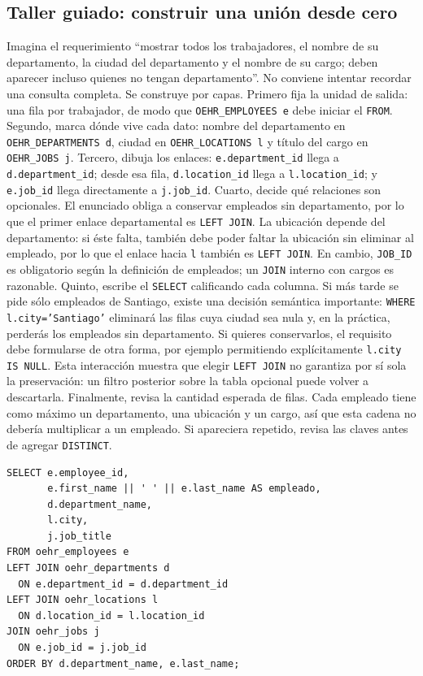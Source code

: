 \documentclass[11pt,a4paper]{article}
\newcommand{\campo}[1]{\texttt{#1}}
\newcommand{\tabla}[1]{\texttt{#1}}
\begin{document}
\subsection{Taller guiado: construir una unión desde cero}

Imagina el requerimiento ``mostrar todos los trabajadores, el nombre de su departamento, la ciudad
del departamento y el nombre de su cargo; deben aparecer incluso quienes no tengan departamento''.
No conviene intentar recordar una consulta completa. Se construye por capas. Primero fija la unidad
de salida: una fila por trabajador, de modo que \tabla{OEHR_EMPLOYEES e} debe iniciar el
\campo{FROM}. Segundo, marca dónde vive cada dato: nombre del departamento en
\tabla{OEHR_DEPARTMENTS d}, ciudad en \tabla{OEHR_LOCATIONS l} y título del cargo en
\tabla{OEHR_JOBS j}. Tercero, dibuja los enlaces: \campo{e.department_id} llega a
\campo{d.department_id}; desde esa fila, \campo{d.location_id} llega a \campo{l.location_id}; y
\campo{e.job_id} llega directamente a \campo{j.job_id}. Cuarto, decide qué relaciones son opcionales.
El enunciado obliga a conservar empleados sin departamento, por lo que el primer enlace departamental
es \campo{LEFT JOIN}. La ubicación depende del departamento: si éste falta, también debe poder faltar
la ubicación sin eliminar al empleado, por lo que el enlace hacia \campo{l} también es
\campo{LEFT JOIN}. En cambio, \campo{JOB_ID} es obligatorio según la definición de empleados; un
\campo{JOIN} interno con cargos es razonable. Quinto, escribe el \campo{SELECT} calificando cada
columna. Si más tarde se pide sólo empleados de Santiago, existe una decisión semántica importante:
\campo{WHERE l.city='Santiago'} eliminará las filas cuya ciudad sea nula y, en la práctica, perderás
los empleados sin departamento. Si quieres conservarlos, el requisito debe formularse de otra forma,
por ejemplo permitiendo explícitamente \campo{l.city IS NULL}. Esta interacción muestra que elegir
\campo{LEFT JOIN} no garantiza por sí sola la preservación: un filtro posterior sobre la tabla opcional
puede volver a descartarla. Finalmente, revisa la cantidad esperada de filas. Cada empleado tiene como
máximo un departamento, una ubicación y un cargo, así que esta cadena no debería multiplicar a un
empleado. Si apareciera repetido, revisa las claves antes de agregar \campo{DISTINCT}.

\begin{lstlisting}
SELECT e.employee_id,
       e.first_name || ' ' || e.last_name AS empleado,
       d.department_name,
       l.city,
       j.job_title
FROM oehr_employees e
LEFT JOIN oehr_departments d
  ON e.department_id = d.department_id
LEFT JOIN oehr_locations l
  ON d.location_id = l.location_id
JOIN oehr_jobs j
  ON e.job_id = j.job_id
ORDER BY d.department_name, e.last_name;
\end{lstlisting}
\end{document}
